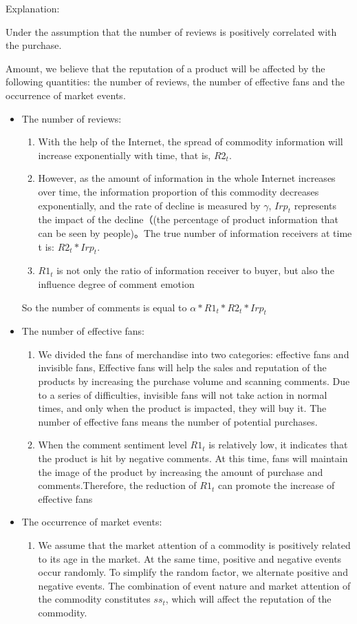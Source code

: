 \documentclass{mcmthesis}
\begin{document}
Explanation:

Under the assumption that the number of reviews is positively correlated with the purchase.

Amount, we believe that the reputation of a product will be affected by the following quantities: the number of reviews, the number of effective fans and the occurrence of market events.

\begin{itemize}
  \item The number of reviews: \\
  \begin{enumerate}
    \item With the help of the Internet, the spread of commodity information will increase exponentially with time, that is, $R2_t$.
    \item However, as the amount of information in the whole Internet increases over time, the information proportion of this commodity decreases exponentially, and the rate of decline is measured by $\gamma$, $Irp_t$ represents the impact of the decline（(the percentage of product information that can be seen by people)。The true number of information receivers at time t is: $R2_t * Irp_t$. 
    \item $R1_t$ is not only the ratio of information receiver to buyer, but also the influence degree of comment emotion
  \end{enumerate}
  So the number of comments is equal to $\alpha * R1_t * R2_t * Irp_t$

  \item The number of effective fans: \\
    \begin{enumerate}
      \item We divided the fans of merchandise into two categories: effective fans and invisible fans, Effective fans will help the sales and reputation of the products by increasing the purchase volume and scanning comments. Due to a series of difficulties, invisible fans will not take action in normal times, and only when the product is impacted, they will buy it. The number of effective fans means the number of potential purchases. 
      \item When the comment sentiment level $R1_t$ is relatively low, it indicates that the product is hit by negative comments. At this time, fans will maintain the image of the product by increasing the amount of purchase and comments.Therefore, the reduction of $R1_t$ can promote the increase of effective fans
    \end{enumerate}
  \item The occurrence of market events: \\
  \begin{enumerate}
    \item We assume that the market attention of a commodity is positively related to its age in the market. At the same time, positive and negative events occur randomly. To simplify the random factor, we alternate positive and negative events. The combination of event nature and market attention of the commodity constitutes $ss_t$, which will affect the reputation of the commodity.
  \end{enumerate}


\end{itemize}
\end{document}
